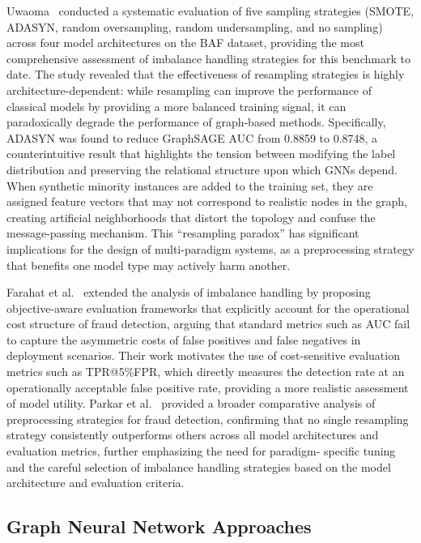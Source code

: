 Uwaoma~\cite{uwaoma2024detecting} conducted a systematic evaluation of five
sampling strategies (SMOTE, ADASYN, random oversampling, random undersampling,
and no sampling) across four model architectures on the BAF dataset, providing
the most comprehensive assessment of imbalance handling strategies for this
benchmark to date. The study revealed that the effectiveness of resampling
strategies is highly architecture-dependent: while resampling can improve the
performance of classical models by providing a more balanced training signal, it
can paradoxically degrade the performance of graph-based methods. Specifically,
ADASYN was found to reduce GraphSAGE AUC from 0.8859 to 0.8748, a
counterintuitive result that highlights the tension between modifying the label
distribution and preserving the relational structure upon which GNNs depend.
When synthetic minority instances are added to the training set, they are
assigned feature vectors that may not correspond to realistic nodes in the
graph, creating artificial neighborhoods that distort the topology and confuse
the message-passing mechanism. This ``resampling paradox'' has significant
implications for the design of multi-paradigm systems, as a preprocessing
strategy that benefits one model type may actively harm another.

Farahat et al.~\cite{farahat2025objective} extended the analysis of imbalance
handling by proposing objective-aware evaluation frameworks that explicitly
account for the operational cost structure of fraud detection, arguing that
standard metrics such as AUC fail to capture the asymmetric costs of false
positives and false negatives in deployment scenarios. Their work motivates the
use of cost-sensitive evaluation metrics such as TPR@5\%FPR, which directly
measures the detection rate at an operationally acceptable false positive rate,
providing a more realistic assessment of model utility. Parkar et
al.~\cite{parkar2024comparative} provided a broader comparative analysis of
preprocessing strategies for fraud detection, confirming that no single
resampling strategy consistently outperforms others across all model
architectures and evaluation metrics, further emphasizing the need for paradigm-
specific tuning and the careful selection of imbalance handling strategies based
on the model architecture and evaluation criteria.

\subsection{Graph Neural Network Approaches}

